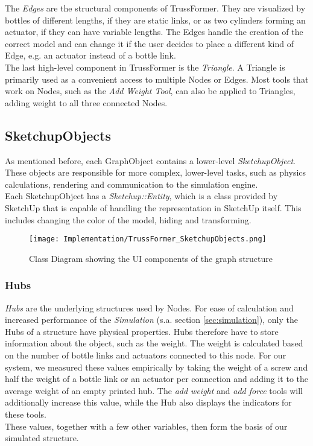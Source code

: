 The \textit{Edges} are the structural components of TrussFormer. They are visualized by bottles of different lengths, if they are static links, or as two cylinders forming an actuator, if they can have variable lengths. The Edges handle the creation of the correct model and can change it if the user decides to place a different kind of Edge, e.g. an actuator instead of a bottle link.\\
The last high-level component in TrussFormer is the \textit{Triangle}. A Triangle is primarily used as a convenient access to multiple Nodes or Edges. Most tools that work on Nodes, such as the \textit{Add Weight Tool}, can also be applied to Triangles, adding weight to all three connected Nodes.

\subsection{SketchupObjects}
As mentioned before, each GraphObject contains a lower-level \textit{SketchupObject}. These objects are responsible for more complex, lower-level tasks, such as physics calculations, rendering and communication to the simulation engine.\\
Each SketchupObject has a \textit{Sketchup::Entity}, which is a class provided by SketchUp that is capable of handling the representation in SketchUp itself. This includes changing the color of the model, hiding and transforming.
\begin{figure}[h!]
    \texttt{[image: Implementation/TrussFormer\_SketchupObjects.png]}
    \centering
    \caption{Class Diagram showing the UI components of the graph structure}
    \label{fig:sketchup_objects}
\end{figure}

\subsubsection{Hubs}
\textit{Hubs} are the underlying structures used by Nodes. For ease of calculation and increased performance of the \textit{Simulation} (s.a. section \ref{sec:simulation}), only the Hubs of a structure have physical properties. Hubs therefore have to store information about the object, such as the weight. The weight is calculated based on the number of bottle links and actuators connected to this node. For our system, we measured these values empirically by taking the weight of a screw and half the weight of a bottle link or an actuator per connection and adding it to the average weight of an empty printed hub. The \textit{add weight} and \textit{add force} tools will additionally increase this value, while the Hub also displays the indicators for these tools.\\
These values, together with a few other variables, then form the basis of our simulated structure.

